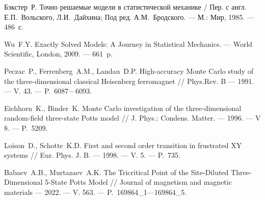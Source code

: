 \begin{thebibliography}{11}







Бэкстер~Р. 
Точно решаемые модели в статистической механике / Пер. с англ. Е.П.~Вольского, Л.И.~Дайхина; Под ред. А.М.~Бродского. 
--- М.: Мир, 1985. 
--- 486~с.





Wu~F.Y. 
Exactly Solved Models: A Journey in Statistical Mechanics. 
--- World Scientific, London, 2009. 
--- 661~p.





Peczac~P., Ferrenberg~A.M., Landau~D.P. 
High-accuracy Monte Carlo study of the three-dimensional classical Heisenberg ferromagnet // Phys.Rev. B 
--- 1991. 
--- V. 43. 
--- P.~6087---6093.





Eichhorn~K., Binder~K. 
Monte Carlo investigation of the three-dimensional random-field three-state Potts model 
// 
J. Phys.: Condens. Matter.
--- 1996. 
--- V 8. 
--- P.~5209.





Loison~D., Schotte~K.D. 
First and second order transition in frustrated XY systems 
// 
Eur. Phys. J. B. 
--- 1998. 
--- V. 5. 
--- P.~735.





Babaev~A.B., Murtazaev~A.K. 
The Tricritical Point of the Site-Diluted Three-Dimensional 5-State Potts Model // Journal of magnetism and magnetic materials 
--- 2022. 
--- V. 563. 
--- P.~169864\_1---169864\_5.






\end{thebibliography}
